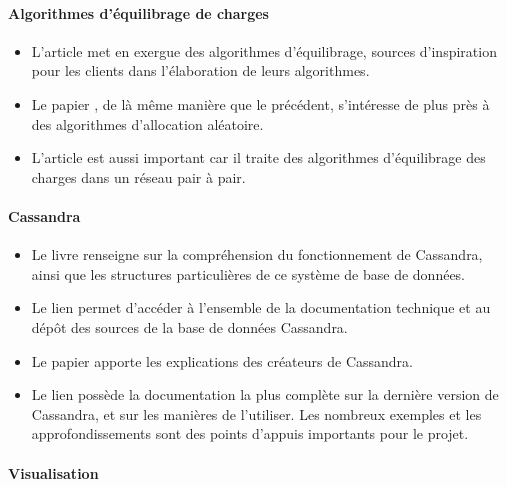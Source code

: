\documentclass[12pt]{article}
\begin{document}
\paragraph{Algorithmes d'équilibrage de charges}

\begin{itemize}
\item L'article \cite{BalancedAlloc99} met en exergue des algorithmes d'équilibrage, sources d'inspiration pour les clients dans l'élaboration de leurs algorithmes.

\item Le papier \cite{RandomChoices05}, de là même manière que le précédent, s'intéresse de plus près à des algorithmes d'allocation aléatoire.

\item L'article \cite{LoadBalancingPeertoPeer14} est aussi important car il traite des algorithmes d'équilibrage des charges dans un réseau pair à pair.

\end{itemize}

\paragraph{Cassandra}

\begin{itemize}
\item Le livre \cite{Hewitt2010} renseigne sur la compréhension du fonctionnement de Cassandra, ainsi que les structures particulières de ce système de base de données.

\item Le lien \cite{ApacheCassandra09} permet d'accéder à l'ensemble de la documentation technique et au dépôt des sources de la base de données Cassandra.

\item Le papier \cite{FacebookCassandra09} apporte les explications des créateurs de Cassandra.

\item Le lien \cite{DSDocCassandra15} possède la documentation la plus complète sur la dernière version de Cassandra, et sur les manières de l'utiliser.
Les nombreux exemples et les approfondissements sont des points d'appuis importants pour le projet.

\end{itemize}

\paragraph{Visualisation}
\end{document}
